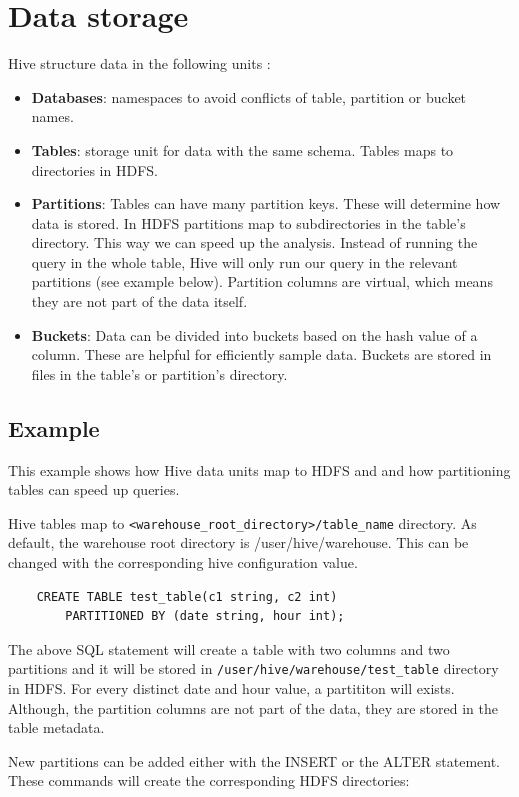 \section{Data storage}
Hive structure data in the following units  \cite{Hive-paper, Hive-data-units}:
\begin{itemize}
\item \textbf{Databases}: namespaces to avoid conflicts of table, partition or bucket names.
\item \textbf{Tables}: storage unit for data with the same schema. Tables maps to directories in HDFS.
\item \textbf{Partitions}: Tables can have many partition keys. These will determine how data is stored. In HDFS partitions map to subdirectories in the table's directory. This way we can speed up the analysis. Instead of running the query in the whole table, Hive will only run our query in the relevant partitions (see example below). Partition columns are virtual, which means they are not part of the data itself.
\item \textbf{Buckets}: Data can be divided into buckets based on the hash value of a column. These are helpful for efficiently sample data. Buckets are stored in files in the table's or partition's directory.
\end{itemize}

\subsection{Example}
This example shows how Hive data units map to HDFS and and how partitioning tables can speed up queries.

Hive tables map to \texttt{<warehouse\_root\_directory>/table\_name} directory. As default, the warehouse root directory is /user/hive/warehouse. This can be changed with the corresponding hive configuration value.
\begin{lstlisting}
	CREATE TABLE test_table(c1 string, c2 int) 
		PARTITIONED BY (date string, hour int);
\end{lstlisting}

The above SQL statement will create a table with two columns and two partitions and it will be stored in  \texttt{/user/hive/warehouse/test\_table} directory in HDFS. For every distinct date and hour value, a partititon will exists. Although, the partition columns are not part of the data, they are stored in the table metadata. 

New partitions can be added either with the INSERT or the ALTER statement. These commands will create the corresponding HDFS directories: 

